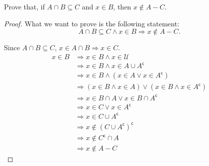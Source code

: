 \documentclass[../main.tex]{subfiles}
\begin{document}
\begin{ex}
    Prove that, if $A \cap B \subseteq C$ and $x \in B$, then $x \notin A - C$.
\end{ex}
\begin{proof}
    What we want to prove is the following statement:
    \[
        A \cap B \subseteq C \wedge x \in B \Rightarrow x \notin A - C.
    \]

    Since $A \cap B \subseteq C$, $x \in A \cap B \Rightarrow  x \in C$.
    \begin{align*}
        x \in B &\Rightarrow x \in B \wedge x \in \mathcal{U}\\
                &\Rightarrow x \in B \wedge x \in A \cup A^\mathsf{c}\\
                &\Rightarrow x \in B \wedge (x \in A \vee x \in A^\mathsf{c})\\
                &\Rightarrow (x \in B \wedge x \in A) \vee (x \in B \wedge x \in A^\mathsf{c})\\
                &\Rightarrow x \in B \cap A \vee x \in B \cap A^\mathsf{c}\\
                &\Rightarrow x \in C \vee x \in A^\mathsf{c}\\
                &\Rightarrow x \in C \cup A^\mathsf{c}\\
                &\Rightarrow x \notin (C \cup A^\mathsf{c})^\mathsf{c}\\
                &\Rightarrow x \notin C^\mathsf{c} \cap A\\
                &\Rightarrow x \notin A - C
    \end{align*}
\end{proof}
\end{document}

